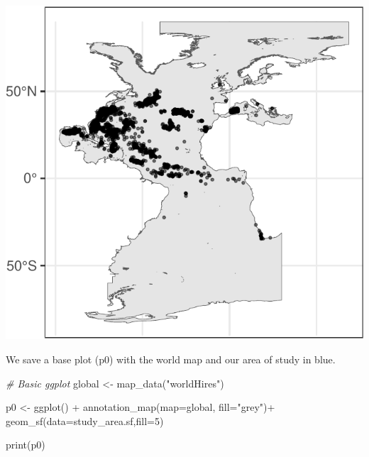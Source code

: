 \documentclass[
]{book}
\newenvironment{Shaded}{\begin{snugshade}}{\end{snugshade}}
\newcommand{\AttributeTok}[1]{\textcolor[rgb]{0.77,0.63,0.00}{#1}}
\newcommand{\CommentTok}[1]{\textcolor[rgb]{0.56,0.35,0.01}{\textit{#1}}}
\newcommand{\DecValTok}[1]{\textcolor[rgb]{0.00,0.00,0.81}{#1}}
\newcommand{\FunctionTok}[1]{\textcolor[rgb]{0.00,0.00,0.00}{#1}}
\newcommand{\NormalTok}[1]{#1}
\newcommand{\OtherTok}[1]{\textcolor[rgb]{0.56,0.35,0.01}{#1}}
\newcommand{\SpecialCharTok}[1]{\textcolor[rgb]{0.00,0.00,0.00}{#1}}
\newcommand{\StringTok}[1]{\textcolor[rgb]{0.31,0.60,0.02}{#1}}
\begin{document}
\includegraphics{_main_files/figure-latex/unnamed-chunk-17-1.pdf}

We save a base plot (p0) with the world map and our area of study in blue.

\begin{Shaded}
\begin{Highlighting}[]
\CommentTok{\# Basic ggplot}
\NormalTok{global }\OtherTok{\textless{}{-}} \FunctionTok{map\_data}\NormalTok{(}\StringTok{"worldHires"}\NormalTok{)}

\NormalTok{p0 }\OtherTok{\textless{}{-}} \FunctionTok{ggplot}\NormalTok{() }\SpecialCharTok{+} 
  \FunctionTok{annotation\_map}\NormalTok{(}\AttributeTok{map=}\NormalTok{global, }\AttributeTok{fill=}\StringTok{"grey"}\NormalTok{)}\SpecialCharTok{+}
  \FunctionTok{geom\_sf}\NormalTok{(}\AttributeTok{data=}\NormalTok{study\_area.sf,}\AttributeTok{fill=}\DecValTok{5}\NormalTok{)}

\FunctionTok{print}\NormalTok{(p0)}
\end{Highlighting}
\end{Shaded}
\end{document}
